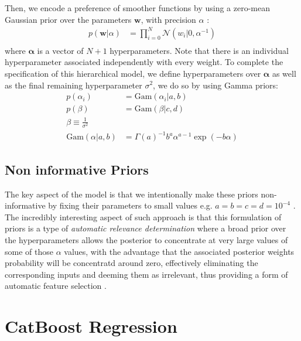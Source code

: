 \noindent Then, we encode a preference of smoother functions by using a zero-mean Gaussian prior over the parameters $\mathbf{w}$, with precision $\alpha$ \cite{tipping}:
\begin{align}
    p(\mathbf{w}|\alpha) &= \prod_{i = 0}^{N} \mathcal{N}(w_i|0, \alpha^{-1}) \\
\end{align}
where $\mathbf{\alpha}$ is a vector of $N + 1$ hyperparameters. Note that there is an individual hyperparameter associated independently with every weight. To complete the specification of this hierarchical model, we define hyperparameters over $\mathbf{\alpha}$ as well as the final remaining hyperparameter $\sigma^2$, we do so by using Gamma priors\cite{tipping}:
\begin{align}
    p(\alpha_i) &= \text{Gam}(\alpha_i|a, b) \\
    p(\beta) &= \text{Gam}(\beta|c, d) \\
    \beta \equiv \frac{1}{\sigma^2} \\
    \text{Gam}(\alpha|a, b) &= \Gamma(a)^{-1} b^a \alpha^{a - 1} \exp(-b\alpha)
\end{align}

\subsection{Non informative Priors}
The key aspect of the model is that we intentionally make these priors non-informative by fixing their parameters to small values e.g. $a = b = c = d = 10^{-4}$ \cite{tipping}. The incredibly interesting aspect of such approach is that this formulation of priors is a type of \textit{automatic relevance determination} \cite{MacKay1996} where a broad prior over the hyperparameters allows the posterior to concentrate at very large values of some of those $\alpha$ values, with the advantage that the associated posterior weights probability will be concentratd around zero, effectively eliminating the corresponding inputs and deeming them as irrelevant, thus providing a form of automatic feature selection \cite{tipping}. 


\section{CatBoost Regression}


